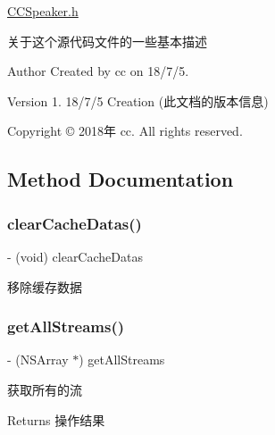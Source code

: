 \hyperlink{_c_c_speaker_8h_source}{C\+C\+Speaker.\+h}

关于这个源代码文件的一些基本描述

\begin{DoxyAuthor}{Author}
Created by cc on 18/7/5.
\end{DoxyAuthor}
\begin{DoxyVersion}{Version}
1. 18/7/5 Creation (此文档的版本信息)
\end{DoxyVersion}
Copyright © 2018年 cc. All rights reserved. 

\subsection{Method Documentation}
\mbox{\label{interface_c_c_speaker_a2cc42a5a8fed6f90cf193eac7cad306a}} 
\subsubsection{\texorpdfstring{clear\+Cache\+Datas()}{clearCacheDatas()}}
{\footnotesize\ttfamily -\/ (void) clear\+Cache\+Datas \begin{DoxyParamCaption}{ }\end{DoxyParamCaption}}

移除缓存数据 \mbox{\label{interface_c_c_speaker_a1cd2a8633022985f13382a6895f96f21}} 
\subsubsection{\texorpdfstring{get\+All\+Streams()}{getAllStreams()}}
{\footnotesize\ttfamily -\/ (N\+S\+Array $\ast$) get\+All\+Streams \begin{DoxyParamCaption}{ }\end{DoxyParamCaption}}

获取所有的流 \begin{DoxyReturn}{Returns}
操作结果 
\end{DoxyReturn}
\mbox{\label{interface_c_c_speaker_a89a3d868010262874a4bb26e349655fb}} 
